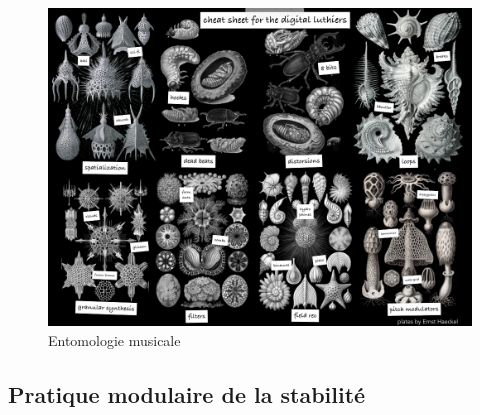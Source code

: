 \begin{figure}[!htbp]
	\includegraphics[width=\textwidth]{gfx/02_ephemeral/Bestiaire.png}
	\caption{Entomologie musicale}
	\label{fig:ephemeral:entomologie}
\end{figure}

\subsection{Pratique modulaire de la stabilité}

